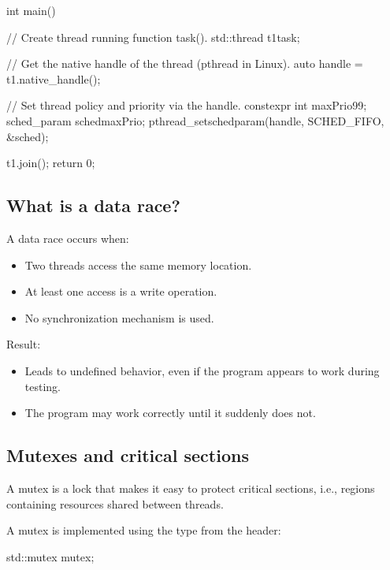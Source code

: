 \begin{cppcode}
int main()
{
    // Create thread running function task().
    std::thread t1{task};

    // Get the native handle of the thread (pthread in Linux).
    auto handle = t1.native_handle();

    // Set thread policy and priority via the handle.
    constexpr int maxPrio{99};
    sched_param sched{maxPrio};
    pthread_setschedparam(handle, SCHED_FIFO, &sched);

    t1.join();
    return 0;
}
\end{cppcode}

\subsection{What is a data race?}
\label{c6:sec:datarace}
A data race occurs when:
\begin{itemize}
  \item Two threads access the same memory location.
  \item At least one access is a write operation.
  \item No synchronization mechanism is used.
\end{itemize}
Result:
\begin{itemize}
  \item Leads to undefined behavior, even if the program appears to work during testing.
  \item The program may work correctly until it suddenly does not.
\end{itemize}

\subsection{Mutexes and critical sections}
\label{c6:sec:mutex}
A mutex is a lock that makes it easy to protect critical sections, i.e., regions containing
resources shared between threads.

A mutex is implemented using the  type from the  header:

\begin{cppcode}
std::mutex mutex{};
\end{cppcode}

